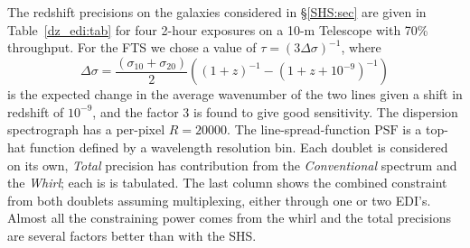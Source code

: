 \documentclass[preprint]{aastex}
\begin{document}
The redshift precisions on the galaxies considered in \S\ref{SHS:sec} are given in Table~\ref{dz_edi:tab}
for four 2-hour exposures on a 10-m Telescope with 70\% throughput.  For the FTS we
chose a value of $\tau=(3\Delta \sigma)^{-1}$, where 
\begin{equation}
\Delta \sigma = \frac{(\sigma_{10}+\sigma_{20})}{2}\left((1+z)^{-1}-(1+z+10^{-9})^{-1}\right)
\end{equation}
is the expected change in the average wavenumber of the two lines given a shift in redshift of $10^{-9}$,
and the factor 3 is found to give good sensitivity.
The dispersion spectrograph has a per-pixel $R=20000$.  The line-spread-function $\mbox{PSF}$ is a top-hat function defined by a wavelength
resolution bin.  Each doublet is considered on its own, {\it Total} precision has contribution from the {\it Conventional} spectrum and the {\it Whirl}; each is
is tabulated.  The last column shows the combined constraint from both doublets assuming multiplexing, either through one or two EDI's.
Almost all the constraining power comes from the whirl and the total precisions are several factors better than with the SHS.
\end{document}
